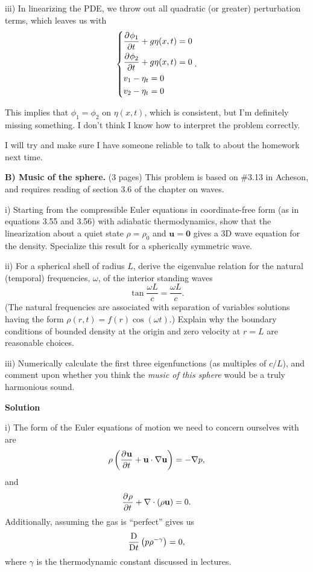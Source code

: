 \documentclass{article}
\def\*#1{\mathbf{#1}}
\newcommand{\dadvd}[2]{\dfrac{\text{D} #1}{\text{D} #2}} %
\begin{document}
iii) In linearizing the PDE, we throw out all quadratic (or greater)
perturbation terms, which leaves us with
%
\begin{equation*}
    \begin{dcases}
        \dpd{\phi_1}{t} + g \eta(x, t) = 0 \\
        \dpd{\phi_2}{t} + g \eta(x, t) = 0 \\
        v_1 - \eta_t = 0 \\
        v_2 - \eta_t = 0
    \end{dcases}
    .
\end{equation*}

This implies that $\phi_1 = \phi_2$ on $\eta(x, t)$, which is
consistent, but I'm definitely missing something. I don't think I know
how to interpret the problem correctly.

I will try and make sure I have someone reliable to talk to about the
homework next time.

\newpage

\textbf{B) Music of the sphere.} (3 pages)
This problem is based on \#3.13 in Acheson, and requires reading of section 3.6
of the chapter on waves.

i) Starting from the compressible Euler equations in coordinate-free
form (as in equations 3.55 and 3.56) with adiabatic thermodynamics, show
that the linearization about a quiet state $\rho = \rho_0$ and $\*u =
\*0$ gives a 3D wave equation for the density. Specialize this result
for a spherically symmetric wave.

ii) For a spherical shell of radius $L$, derive the eigenvalue relation
for the natural (temporal) frequencies, $\omega$, of the interior
standing waves
%
\begin{equation*}
    \tan \frac{\omega L}{c} = \frac{\omega L}{c}
    .
\end{equation*}
%
(The natural frequencies are associated with separation of variables
solutions having the form $\rho(r, t) = f(r) \cos(\omega t)$.) Explain
why the boundary conditions of bounded density at the origin and zero
velocity at $r = L$ are reasonable choices.

iii) Numerically calculate the first three eigenfunctions (as multiples of
$c / L$), and comment upon whether you think the \textit{music of this sphere}
would be a truly harmonious sound.

\newpage

\textbf{Solution}

i) The form of the Euler equations of motion we need to concern
ourselves with are
%
\begin{equation}
    \rho \del{\dpd{\*u}{t} + \*u \cdot \nabla \*u} = - \nabla p
    ,
    \label{eq:b-mom}
\end{equation}
%
and
%
\begin{equation}
    \dpd{\rho}{t} + \nabla \cdot \del{\rho \*u} = 0
    .
    \label{eq:b-cons}
\end{equation}
%
Additionally, assuming the gas is ``perfect'' gives us
%
\begin{equation}
    \dadvd{}{t} \del{p \rho^{-\gamma}} = 0
    ,
    \label{eq:b-adiab}
\end{equation}
%
where $\gamma$ is the thermodynamic constant discussed in lectures.
\end{document}
